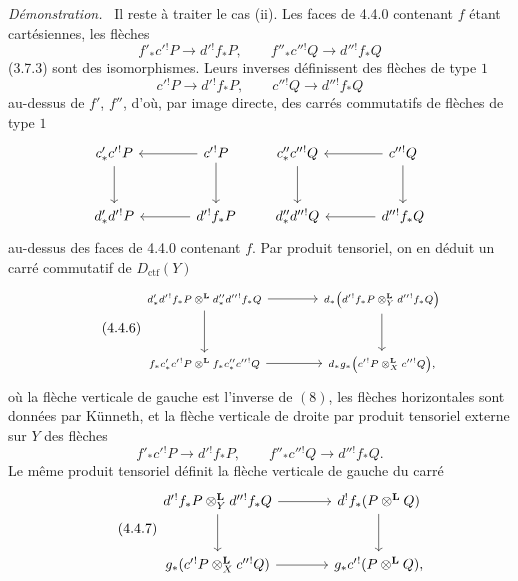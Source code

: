 \documentclass[11pt]{article}
\newenvironment{prooftext}[1][Proof]{\par\noindent\emph{#1.}\ }{\par\medskip}
\providecommand{\Dctf}{D_{\mathrm{ctf}}}
\providecommand{\Dctf}{D_{\mathrm{ctf}}}
\begin{document}
\begin{prooftext}[Démonstration]
Il reste à traiter le cas (ii). Les faces de 4.4.0 contenant $f$ étant cartésiennes, les flèches
\[
f'_*c'{}^!P\longrightarrow d'{}^!f_*P,\qquad
f''_*c''{}^!Q\longrightarrow d''{}^!f_*Q
\]
(3.7.3) sont des isomorphismes. Leurs inverses définissent des flèches de type $1$
\[
c'{}^!P\longrightarrow d'{}^!f_*P,\qquad
c''{}^!Q\longrightarrow d''{}^!f_*Q
\]
au-dessus de $f'$, $f''$, d'où, par image directe, des carrés commutatifs de flèches de type $1$
\[
\begin{tikzcd}[column sep=large,row sep=large]
c'_*c'{}^!P \arrow[d] & c'{}^!P\arrow[l]\arrow[d]\\
d'_*d'{}^!P & d'{}^!f_*P\arrow[l]
\end{tikzcd}
\qquad
\begin{tikzcd}[column sep=large,row sep=large]
c''_*c''{}^!Q \arrow[d] & c''{}^!Q\arrow[l]\arrow[d]\\
d''_*d''{}^!Q & d''{}^!f_*Q\arrow[l]
\end{tikzcd}
\]
au-dessus des faces de 4.4.0 contenant $f$. Par produit tensoriel, on en déduit un carré commutatif de $\Dctf(Y)$
\begin{equation}
\tag{4.4.6}
\begin{tikzcd}[column sep=large,row sep=large,cells={nodes={font=\scriptsize}},every label/.append style={font=\scriptsize}]
d'_*d'{}^!f_*P\otimes^{\mathbf L}d''_*d''{}^!f_*Q
 \arrow[r]\arrow[d] &
d_*\bigl(d'{}^!f_*P\otimes_Y^{\mathbf L}d''{}^!f_*Q\bigr)\arrow[d]\\
f_*c'_*c'{}^!P\otimes^{\mathbf L}f_*c''_*c''{}^!Q
 \arrow[r] &
d_*g_*\bigl(c'{}^!P\otimes_X^{\mathbf L}c''{}^!Q\bigr),
\end{tikzcd}
\end{equation}
où la flèche verticale de gauche est l'inverse de $(8)$, les flèches horizontales sont données par Künneth, et la flèche verticale de droite par produit tensoriel externe sur $Y$ des flèches
\[
f'_*c'{}^!P\longrightarrow d'{}^!f_*P,\qquad
f''_*c''{}^!Q\longrightarrow d''{}^!f_*Q.
\]
Le même produit tensoriel définit la flèche verticale de gauche du carré
\begin{equation}
\tag{4.4.7}
\begin{tikzcd}[column sep=large,row sep=large]
d'{}^!f_*P\otimes_Y^{\mathbf L}d''{}^!f_*Q
 \arrow[r]\arrow[d] &
d^!f_*(P\otimes^{\mathbf L}Q)\arrow[d]\\
g_*(c'{}^!P\otimes_X^{\mathbf L}c''{}^!Q)
 \arrow[r] &
g_*c'{}^!(P\otimes^{\mathbf L}Q),

\end{tikzcd}
\end{equation}
\end{prooftext}
\end{document}
